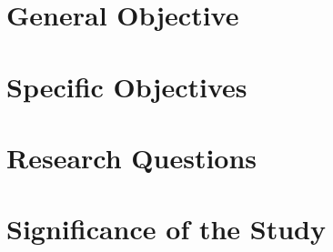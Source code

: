 
\section{General Objective}

\section{Specific Objectives}


\section{Research Questions}


\section{Significance of the Study}
